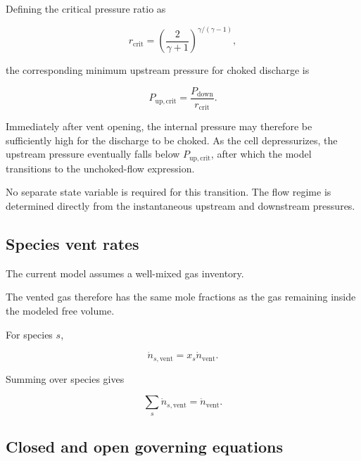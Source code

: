 Defining the critical pressure ratio as

\begin{equation}
    r_{\mathrm{crit}}
    =
    \left(
        \frac{2}{\gamma+1}
    \right)^{
        \gamma/(\gamma-1)
    },
\end{equation}

the corresponding minimum upstream pressure for choked discharge is

\begin{equation}
    P_{\mathrm{up,crit}}
    =
    \frac{
        P_{\mathrm{down}}
    }{
        r_{\mathrm{crit}}
    }.
    \label{eq:critical_upstream_pressure}
\end{equation}

Immediately after vent opening, the internal pressure may therefore be
sufficiently high for the discharge to be choked. As the cell
depressurizes, the upstream pressure eventually falls below
$P_{\mathrm{up,crit}}$, after which the model transitions to the
unchoked-flow expression.

No separate state variable is required for this transition. The flow
regime is determined directly from the instantaneous upstream and
downstream pressures.

\subsection{Species vent rates}

The current model assumes a well-mixed gas inventory.

The vented gas therefore has the same mole fractions as the gas
remaining inside the modeled free volume.

For species $s$,

\begin{equation}
    \dot{n}_{s,\mathrm{vent}}
    =
    x_s
    \dot{n}_{\mathrm{vent}}.
    \label{eq:species_vent_flow}
\end{equation}

Summing over species gives

\begin{equation}
    \sum_s
    \dot{n}_{s,\mathrm{vent}}
    =
    \dot{n}_{\mathrm{vent}}.
\end{equation}


\subsection{Closed and open governing equations}

